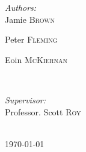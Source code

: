 \begin{titlepage}
\vspace{1cm}
 

\begin{minipage}[t]{0.4\textwidth}
\begin{flushleft} \large
\emph{Authors:}\\
Jamie \textsc{Brown} %

Peter \textsc{Fleming} %

Eoin \textsc{McKiernan}
\end{flushleft}
\end{minipage}
~
\begin{minipage}[t]{0.4\textwidth}
\begin{flushright} \large
\emph{Supervisor:} \\
Professor. Scott \textsc{Roy} %

\end{flushright}
\end{minipage}\\[2cm]

{\large \today}\\[2cm] %

\vfill %

\end{titlepage}